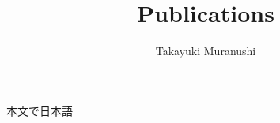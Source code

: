 \documentclass{article}
\title{Publications}
\author{Takayuki Muranushi}
\begin{document}
\begin{CJK}{UTF8}{min}

\maketitle

\begin{bibunit}[custom2]
  \nocite{*}

  本文で日本語

  \renewcommand\refname{Books}
  \putbib[books]
\end{bibunit}


\begin{bibunit}[custom2]
  \nocite{*}

  \renewcommand\refname{Peer-reviewed Publications}
  \putbib[publications]
\end{bibunit}

\end{CJK}
\end{document}

